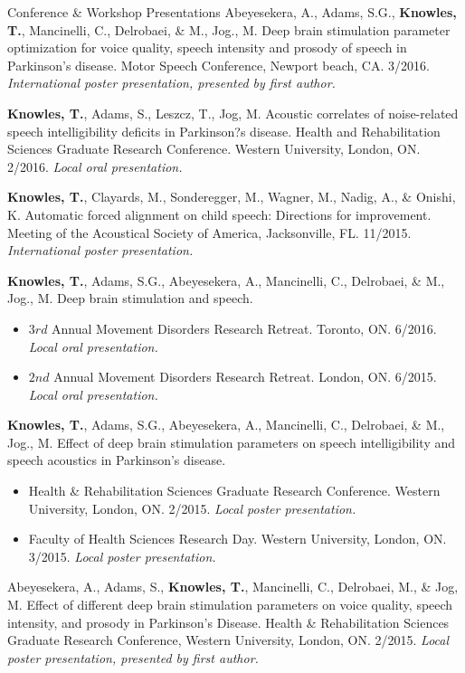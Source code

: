 \documentclass{resume} %
\begin{document}
\begin{rSection}{Conference \& Workshop Presentations}
	Abeyesekera, A., Adams, S.G., {\bf Knowles, T.}, Mancinelli, C., Delrobaei, \& M., Jog., M. Deep brain stimulation parameter optimization for voice quality, speech intensity and prosody of speech in Parkinson's disease. Motor Speech Conference, Newport beach, CA. 3/2016. \emph{International poster presentation, presented by first author.}
	
	{\bf Knowles, T.}, Adams, S., Leszcz, T., Jog, M. Acoustic correlates of noise-related speech intelligibility deficits in Parkinson?s disease. Health and Rehabilitation Sciences Graduate Research Conference. Western University, London, ON. 2/2016. \emph{Local oral presentation.}
	
	{\bf Knowles, T.}, Clayards, M., Sonderegger, M., Wagner, M., Nadig, A., \& Onishi, K. Automatic forced alignment on child speech: Directions for improvement. Meeting of the Acoustical Society of America, Jacksonville, FL. 11/2015. \emph{International poster presentation.}
	
	{\bf Knowles, T.}, Adams, S.G., Abeyesekera, A., Mancinelli, C., Delrobaei, \& M., Jog., M. Deep brain stimulation and speech.
	\begin{itemize}
				\renewcommand\labelitemi{$\cdot$}
		\item $3rd$ Annual Movement Disorders Research Retreat. Toronto, ON. 6/2016.  \emph{Local oral presentation.}
		\item $2nd$ Annual Movement Disorders Research Retreat. London, ON. 6/2015.  \emph{Local oral presentation.}
	\end{itemize}
	
	{\bf Knowles, T.}, Adams, S.G., Abeyesekera, A., Mancinelli, C., Delrobaei, \& M., Jog., M. Effect of deep brain stimulation parameters on speech intelligibility and speech acoustics in Parkinson's disease. 
	\begin{itemize}
				\renewcommand\labelitemi{$\cdot$}
		\item Health \& Rehabilitation Sciences Graduate Research Conference. Western University, London, ON.  2/2015.  \emph{Local poster presentation.}
		\item Faculty of Health Sciences Research Day. Western University, London, ON. 3/2015.  \emph{Local poster presentation.}
	\end{itemize}
	
	Abeyesekera, A., Adams, S., {\bf Knowles, T.}, Mancinelli, C., Delrobaei, M., \& Jog, M. Effect of different deep brain stimulation parameters on voice quality, speech intensity, and prosody in Parkinson's Disease. Health \& Rehabilitation Sciences Graduate Research Conference, Western University, London, ON. 2/2015.  \emph{Local poster presentation, presented by first author.}
	

\end{rSection}
\end{document}
